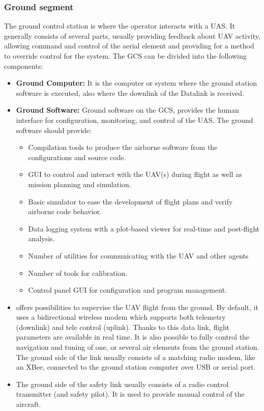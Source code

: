 \subsubsection{Ground segment} 
The ground control station is where the operator interacts with a UAS. It generally consists of several parts, usually providing feedback about UAV activity, allowing command and control of the aerial element and providing for a method to override control for the system.
The GCS can be divided into the following components:
\begin{itemize}
    \item \textbf{Ground Computer:} It is the computer or system where the ground station software is executed, also where the downlink of the Datalink is received.
    \item \textbf{Ground Software:}  Ground software on the GCS, provides the human interface for configuration, monitoring, and control of the UAS. The ground software should provide:
    \begin{itemize}
        \item Compilation tools to produce the airborne software from the configurations and source code.
        \item GUI to control and interact with the UAV(s) during flight as well as mission planning and simulation.
        \item Basic simulator to ease the development of flight plans and verify airborne code behavior.
        \item Data logging system with a plot-based viewer for real-time and post-flight analysis.
        \item Number of utilities for communicating with the UAV and other agents
        \item Number of tools for calibration.
        \item Control panel GUI for configuration and program management.
    \end{itemize}
    \item {} offers possibilities to supervise the UAV flight from the ground. By default, it uses a bidirectional wireless modem which supports both telemetry (downlink) and tele control (uplink). Thanks to this data link, flight parameters are available in real time. It is also possible to fully control the navigation and tuning of one, or several air elements from the ground station. The ground side of the link usually consists of a matching radio modem, like an XBee, connected to the ground station computer over USB or serial port.
    \item {} The ground side of the safety link usually consists of a radio control transmitter (and safety pilot). It is used to provide manual control of the aircraft.
\end{itemize}

